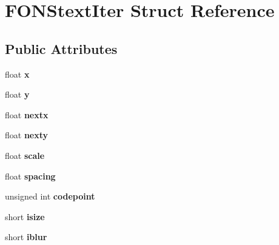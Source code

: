 \hypertarget{struct_f_o_n_stext_iter}{\section{F\+O\+N\+Stext\+Iter Struct Reference}
\label{struct_f_o_n_stext_iter}
}
\subsection*{Public Attributes}
\begin{DoxyCompactItemize}
\item 
\hypertarget{struct_f_o_n_stext_iter_a84dee1d692f8d5a0b276a4b3c14305ca}{float {\bfseries x}}\label{struct_f_o_n_stext_iter_a84dee1d692f8d5a0b276a4b3c14305ca}

\item 
\hypertarget{struct_f_o_n_stext_iter_a67aabad5be6a2e582f855d3fc985e482}{float {\bfseries y}}\label{struct_f_o_n_stext_iter_a67aabad5be6a2e582f855d3fc985e482}

\item 
\hypertarget{struct_f_o_n_stext_iter_a6467960683f07de34018cdd9bfe03991}{float {\bfseries nextx}}\label{struct_f_o_n_stext_iter_a6467960683f07de34018cdd9bfe03991}

\item 
\hypertarget{struct_f_o_n_stext_iter_a2f3311f7c9c6c182f2d70d9351db2882}{float {\bfseries nexty}}\label{struct_f_o_n_stext_iter_a2f3311f7c9c6c182f2d70d9351db2882}

\item 
\hypertarget{struct_f_o_n_stext_iter_a5738db7ad58f0e63b18ea45749a19b1a}{float {\bfseries scale}}\label{struct_f_o_n_stext_iter_a5738db7ad58f0e63b18ea45749a19b1a}

\item 
\hypertarget{struct_f_o_n_stext_iter_a9918e73c1fa648fe7381825f0a4e1580}{float {\bfseries spacing}}\label{struct_f_o_n_stext_iter_a9918e73c1fa648fe7381825f0a4e1580}

\item 
\hypertarget{struct_f_o_n_stext_iter_aa5f74c11fa7741d0050e5a1840169ffd}{unsigned int {\bfseries codepoint}}\label{struct_f_o_n_stext_iter_aa5f74c11fa7741d0050e5a1840169ffd}

\item 
\hypertarget{struct_f_o_n_stext_iter_ad19f972c53904750e404160b6d69b8ff}{short {\bfseries isize}}\label{struct_f_o_n_stext_iter_ad19f972c53904750e404160b6d69b8ff}

\item 
\hypertarget{struct_f_o_n_stext_iter_ae337cf367c38b8ebb02b417e261f7142}{short {\bfseries iblur}}\label{struct_f_o_n_stext_iter_ae337cf367c38b8ebb02b417e261f7142}


\end{DoxyCompactItemize}
